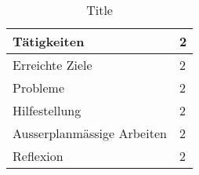 \documentclass{article}
\begin{document}
\begin{table}[]

\caption{Title}
\centering
\begin{tabular}{|p{3cm}|p{8cm}|}
 \hline
 Tätigkeiten & 2  \\
 \hline
 Erreichte Ziele & 2  \\
  \hline
 Probleme & 2  \\
 \hline
 Hilfestellung & 2  \\
 \hline
 Ausserplanmässige Arbeiten & 2  \\
 \hline
 Reflexion & 2  \\
\hline
\end{tabular}
\end{table}
\end{document}
